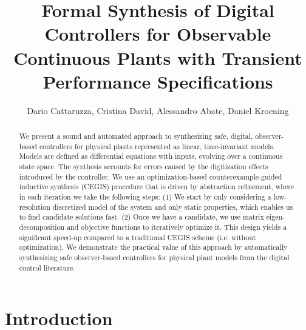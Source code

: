 \documentclass[sigconf]{llncs}
\begin{document}
\title{Formal Synthesis of Digital Controllers for Observable Continuous
Plants with Transient Performance Specifications}

\author{Dario Cattaruzza, Cristina David, Alessandro Abate, Daniel Kroening}%



\maketitle


\begin{abstract} 
%
We present a sound and automated approach to synthesizing safe,
digital, observer-based controllers for physical plants represented as
linear, time-invariant models.  Models are defined as differential
equations with inputs, evolving over a continuous state space. The
synthesis accounts for errors caused by the digitization effects
introduced by the controller.  We use an optimization-based
counterexample-guided inductive synthesis (CEGIS) procedure that is
driven by abstraction refinement, where in each iteration we take the
following steps: (1) We start by only considering a low-resolution
discretized model of the system and only static properties, which
enables us to find candidate solutions fast.  (2) Once we have a
candidate, we use matrix eigen-decomposition
and objective functions to iteratively optimize it.
This design yields a significant speed-up compared to a traditional
CEGIS scheme (i.e. without optimization).  We demonstrate the
practical value of this approach by automatically synthesizing safe
observer-based controllers for physical plant models from the digital
control literature.
%
\end{abstract}

\section{Introduction}
\end{document}

